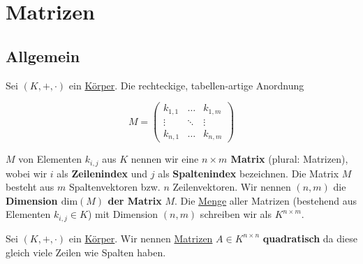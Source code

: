 \documentclass[../../main.tex]{subfiles}
\begin{document}
	
	\chapter{Matrizen}
	
	\section{Allgemein}
	
	\begin{definition}
		\label{def:Matrix}
		\label{def:DimensionMatrix}
		\label{def:Spaltenindex}
		\label{def:Zeilenindex}
		Sei $(K,+,\cdot)$ ein \hyperref[def:Körper]{Körper}. Die rechteckige, tabellen-artige Anordnung 
		
		$$M = \begin{pmatrix}
			k_{1,1} & \dots & k_{1,m} \\
			\vdots  & \ddots & \vdots \\
			k_{n,1} & \dots & k_{n,m}
		\end{pmatrix}$$
		
		$M$ von Elementen $k_{i,j}$ aus $K$ nennen wir eine \textbf{$n\times m$ Matrix} (plural: Matrizen), wobei wir $i$ als \textbf{Zeilenindex} und $j$ als \textbf{Spaltenindex} bezeichnen. Die Matrix $M$ besteht aus $m$ Spaltenvektoren bzw. $n$ Zeilenvektoren. Wir nennen $(n,m)$ die \textbf{Dimension $\textrm{dim}(M)$ der Matrix} $M$. Die \hyperref[def:Menge]{Menge} aller Matrizen (bestehend aus Elementen $k_{i,j} \in K$) mit Dimension $(n,m)$ schreiben wir als $K^{n \times m}$. 
	\end{definition}

	\begin{definition}
		\label{def:QuadratischeMatrix}
		Sei $(K,+,\cdot)$ ein \hyperref[def:Körper]{Körper}. Wir nennen \hyperref[def:Matrix]{Matrizen} $A \in K^{n \times n}$ \textbf{quadratisch} da diese gleich viele Zeilen wie Spalten haben. 
	\end{definition}
\end{document}
